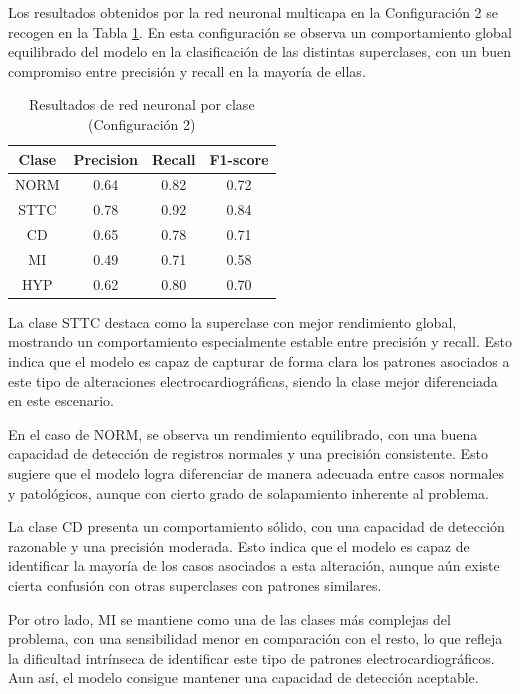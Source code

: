 \documentclass[12pt,a4paper,twoside]{book}
\begin{document}
\vspace{0.5cm}

Los resultados obtenidos por la red neuronal multicapa en la Configuración 2 se recogen en la Tabla \ref{tab:metrics_clase_mlp_feat12}. 
En esta configuración se observa un comportamiento global equilibrado del modelo en la clasificación de las distintas superclases, con un buen compromiso entre precisión y recall en la mayoría de ellas.

\begin{table}[H]
	\centering
	\begin{tabular}{|c|c|c|c|}
	\hline
	\textbf{Clase} & \textbf{Precision} & \textbf{Recall} & \textbf{F1-score} \\
	\hline
	NORM & 0.64 & 0.82 & 0.72 \\
	STTC & 0.78 & 0.92 & 0.84 \\
	CD   & 0.65 & 0.78 & 0.71 \\
	MI   & 0.49 & 0.71 & 0.58 \\
	HYP  & 0.62 & 0.80 & 0.70 \\
	\hline
	\end{tabular}
	\caption{Resultados de red neuronal por clase (Configuración 2)}
	\label{tab:metrics_clase_mlp_feat12}
\end{table}

La clase STTC destaca como la superclase con mejor rendimiento global, mostrando un comportamiento especialmente estable entre precisión y recall. 
Esto indica que el modelo es capaz de capturar de forma clara los patrones asociados a este tipo de alteraciones electrocardiográficas, siendo la clase mejor diferenciada en este escenario.

En el caso de NORM, se observa un rendimiento equilibrado, con una buena capacidad de detección de registros normales y una precisión consistente. 
Esto sugiere que el modelo logra diferenciar de manera adecuada entre casos normales y patológicos, aunque con cierto grado de solapamiento inherente al problema.

La clase CD presenta un comportamiento sólido, con una capacidad de detección razonable y una precisión moderada. 
Esto indica que el modelo es capaz de identificar la mayoría de los casos asociados a esta alteración, aunque aún existe cierta confusión con otras superclases con patrones similares.

Por otro lado, MI se mantiene como una de las clases más complejas del problema, con una sensibilidad menor en comparación con el resto, lo que refleja la dificultad intrínseca de identificar este tipo de patrones electrocardiográficos. 
Aun así, el modelo consigue mantener una capacidad de detección aceptable.
\end{document}
